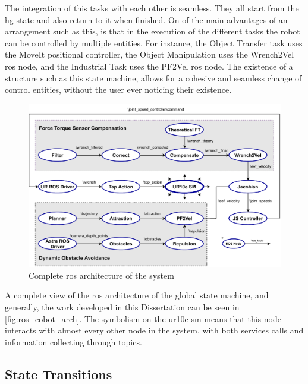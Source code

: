 \par The integration of this tasks with each other is seamless. They all start from the \ac{hg} state and also return to it when finished. On of the main advantages of an arrangement such as this, is that in the execution of the different tasks the robot can be controlled by multiple entities. For instance, the Object Transfer task uses the MoveIt positional controller, the Object Manipulation uses the Wrench2Vel \ac{ros} node, and the Industrial Task uses the PF2Vel \ac{ros} node. The existence of a structure such as this state machine, allows for a cohesive and seamless change of control entities, without the user ever noticing their existence.

\begin{figure}[h]
    \centering
    \includegraphics[width=\linewidth]{figs/chp5/ros_cobot_arch.pdf}
    \caption{Complete \ac{ros} architecture of the system}
    \label{fig:ros_cobot_arch}
\end{figure}

\par A complete view of the \ac{ros} architecture of the global state machine, and generally, the work developed in this Dissertation can be seen in \autoref{fig:ros_cobot_arch}. The symbolism on the \ac{ur10e} \ac{sm} means that this node interacts with almost every other node in the system, with both services calls and information collecting through topics.



\subsection{State Transitions}
\label{ssec:double_tap}

